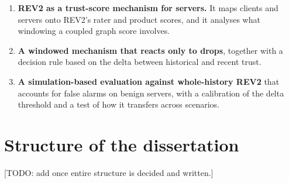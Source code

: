 \begin{enumerate}
    \item \textbf{REV2 as a trust-score mechanism for  servers.} It maps clients and servers onto REV2's rater and product scores, and it analyses what windowing a coupled graph score involves.

    \item \textbf{A windowed mechanism that reacts only to drops}, together with a decision rule based on the delta between historical and recent trust.

    \item \textbf{A simulation-based evaluation against whole-history REV2} that accounts for false alarms on benign servers, with a calibration of the delta threshold and a test of how it transfers across scenarios.
\end{enumerate}

\section{Structure of the dissertation}\label{sec:structure}

[TODO: add once entire structure is decided and written.]
